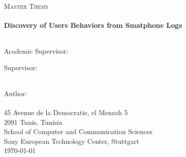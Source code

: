 \documentclass[11pt, oneside]{Thesis} %
\begin{document}
\begin{titlepage}
\begin{center}

\textsc{\LARGE \univname}\\[1.5cm] %
\textsc{\Large Master Thesis}\\[0.5cm] %

\HRule \\[0.4cm] %
{\huge \bfseries Discovery of Users Behaviors from Smatphone Logs}\\[0.4cm] %
\HRule \\[1.5cm] %
 
\begin{minipage}{0.4\textwidth}
\begin{flushleft} \large
{Academic Supervisor:}\\
{\examname} %
\end{flushleft}
\end{minipage}
\begin{minipage}{0.4\textwidth}
\begin{flushright} \large
{Supervisor:} \\
{\supname} %
\end{flushright}
\end{minipage}\\[3cm]
 
\large {Author:}\\
\large {\authornames}\\[0.3cm] %
\large{45 Avenue de la Democratie, el Menzah 5}\\ 
\large{2091 Tunis, Tunisia}\\[1cm]
\large{School of Computer and Communication Sciences}\\
\large{Sony European Technology Center, Stuttgart}\\[2cm]
 
{\large \today}\\[4cm] %
 
\vfill
\end{center}

\end{titlepage}


\end{document}

